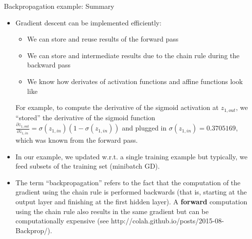 \begin{vbframe} {Backpropagation example: Summary}

  \begin{itemize}
    \item Gradient descent can be implemented efficiently: 
    \begin{itemize}
      \item We can store and reuse results of the forward pass
      \item We can store and intermediate results due to the chain rule during the backward pass  
      \item We know how derivates of activation functions and affine functions look like
    \end{itemize}
    For example, to compute the derivative of the sigmoid activation at $z_{1,out}$, we \enquote{stored} the derivative of the sigmoid function $\frac{\partial z_{1,out}}{\partial z_{1,in}} = \sigma(z_{1,in})(1-\sigma(z_{1,in}))$ and plugged in $\sigma(z_{1,in}) = \num[round-mode=places,round-precision=4]{0.3705169}$, which was known from the forward pass.
\end{itemize}
\framebreak  

  \begin{itemize}
  \item In our example, we updated w.r.t. a single training example but typically, we feed subsets of the training set (minibatch GD).
    \item The term \enquote{backpropagation} refers to the fact that the computation of the gradient using the chain rule is performed backwards (that is, starting at the output layer and finishing at the first hidden layer). 
      A \textbf{forward} computation using the chain rule also results in the same gradient but can be computationally expensive (see http://colah.github.io/posts/2015-08-Backprop/).
 \end{itemize}
\end{vbframe} 

